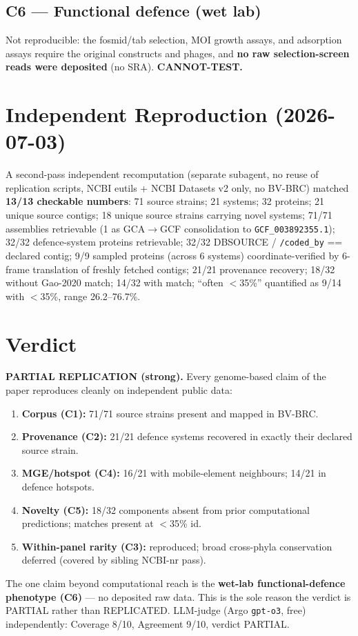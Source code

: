 \documentclass[11pt,letterpaper]{article}
\begin{document}
\subsection{C6 --- Functional defence (wet lab)}
Not reproducible: the fosmid/tab selection, MOI growth assays, and adsorption assays require the original constructs and phages, and \textbf{no raw selection-screen reads were deposited} (no SRA). \textbf{CANNOT-TEST.}

\section{Independent Reproduction (2026-07-03)}
A second-pass independent recomputation (separate subagent, no reuse of replication scripts, NCBI eutils + NCBI Datasets v2 only, no BV-BRC) matched \textbf{13/13 checkable numbers}: 71 source strains; 21 systems; 32 proteins; 21 unique source contigs; 18 unique source strains carrying novel systems; 71/71 assemblies retrievable (1 as GCA$\rightarrow$GCF consolidation to \texttt{GCF\_003892355.1}); 32/32 defence-system proteins retrievable; 32/32 DBSOURCE / \texttt{/coded\_by} == declared contig; 9/9 sampled proteins (across 6 systems) coordinate-verified by 6-frame translation of freshly fetched contigs; 21/21 provenance recovery; 18/32 without Gao-2020 match; 14/32 with match; ``often $<$35\%'' quantified as 9/14 with $<$35\%, range 26.2--76.7\%.

\section{Verdict}
\textbf{PARTIAL REPLICATION (strong).} Every genome-based claim of the paper reproduces cleanly on independent public data:
\begin{enumerate}
    \item \textbf{Corpus (C1):} 71/71 source strains present and mapped in BV-BRC.
    \item \textbf{Provenance (C2):} 21/21 defence systems recovered in exactly their declared source strain.
    \item \textbf{MGE/hotspot (C4):} 16/21 with mobile-element neighbours; 14/21 in defence hotspots.
    \item \textbf{Novelty (C5):} 18/32 components absent from prior computational predictions; matches present at $<$35\% id.
    \item \textbf{Within-panel rarity (C3):} reproduced; broad cross-phyla conservation deferred (covered by sibling NCBI-nr pass).
\end{enumerate}
The one claim beyond computational reach is the \textbf{wet-lab functional-defence phenotype (C6)} --- no deposited raw data. This is the sole reason the verdict is PARTIAL rather than REPLICATED. LLM-judge (Argo \texttt{gpt-o3}, free) independently: Coverage 8/10, Agreement 9/10, verdict PARTIAL.
\end{document}
